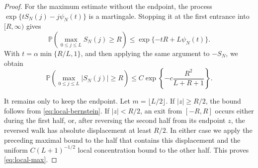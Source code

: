 \documentclass[10pt,a4paper]{amsart}
\newcommand{\Pp}{\mathbb P}
\begin{document}
\begin{proof}
For the maximum estimate without the endpoint, the process
\(\exp\{tS_N(j)-j\psi_N(t)\}\) is a martingale. Stopping it at the first
entrance into \([R,\infty)\) gives
\[
 \Pp\left(\max_{0\le j\le L}S_N(j)\ge R\right)
 \le \exp\{-tR+L\psi_N(t)\}.
\]
With \(t=\alpha\min\{R/L,1\}\), and then applying the same argument to
\(-S_N\), we obtain
\[
 \Pp\left(\max_{0\le j\le L}|S_N(j)|\ge R\right)
 \le C\exp\left\{-c\frac{R^2}{L+R+1}\right\}.
\]

It remains only to keep the endpoint. Let \(m=\lfloor L/2\rfloor\). If
\(|z|\ge R/2\), the bound follows from \eqref{eq:local-bernstein}. If
\(|z|<R/2\), an exit from \([-R,R]\) occurs either during the first half,
or, after reversing the second half from its endpoint \(z\), the reversed
walk has absolute displacement at least \(R/2\). In either case we apply
the preceding maximal bound to the half that contains this displacement
and the uniform \(C(L+1)^{-1/2}\) local concentration bound to the other
half. This proves \eqref{eq:local-max}.
\end{proof}
\end{document}
